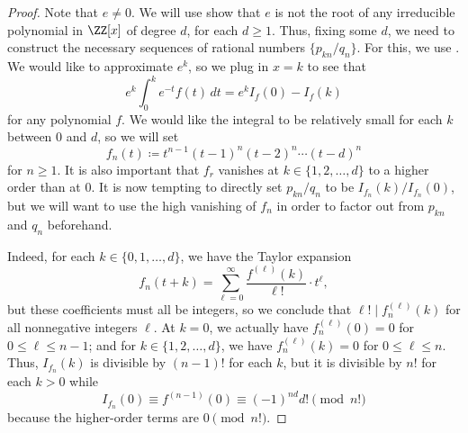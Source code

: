 \documentclass[../notes.tex]{subfiles}
\begin{document}
\begin{proof}
	Note that $e\ne0$. We will use  show that $e$ is not the root of any irreducible polynomial in $\ZZ[x]$ of degree $d$, for each $d\ge1$. Thus, fixing some $d$, we need to construct the necessary sequences of rational numbers $\{p_{kn}/q_n\}$. For this, we use . We would like to approximate $e^k$, so we plug in $x=k$ to see that
	\[e^k\int_0^ke^{-t}f(t)\,dt=e^kI_f(0)-I_f(k)\]
	for any polynomial $f$. We would like the integral to be relatively small for each $k$ between $0$ and $d$, so we will set
	\[f_n(t)\coloneqq t^{n-1}(t-1)^n(t-2)^n\cdots(t-d)^n\]
	for $n\ge1$. It is also important that $f_r$ vanishes at $k\in\{1,2,\ldots,d\}$ to a higher order than at $0$. It is now tempting to directly set $p_{kn}/q_n$ to be $I_{f_n}(k)/I_{f_n}(0)$, but we will want to use the high vanishing of $f_n$ in order to factor out from $p_{kn}$ and $q_n$ beforehand.

	Indeed, for each $k\in\{0,1,\ldots,d\}$, we have the Taylor expansion
	\[f_n(t+k)=\sum_{\ell=0}^\infty\frac{f^{(\ell)}(k)}{\ell!}\cdot t^\ell,\]
	but these coefficients must all be integers, so we conclude that $\ell!\mid f_n^{(\ell)}(k)$ for all nonnegative integers $\ell$. At $k=0$, we actually have $f_n^{(\ell)}(0)=0$ for $0\le\ell\le n-1$; and for $k\in\{1,2,\ldots,d\}$, we have $f_n^{(\ell)}(k)=0$ for $0\le\ell\le n$. Thus, $I_{f_n}(k)$ is divisible by $(n-1)!$ for each $k$, but it is divisible by $n!$ for each $k>0$ while
	\begin{equation}
		I_{f_n}(0)\equiv f^{(n-1)}(0)\equiv(-1)^{nd}d!\pmod{n!} \label{eq:i-fn-mod-n}
	\end{equation}
	because the higher-order terms are $0\pmod{n!}$.


\end{proof}
\end{document}
